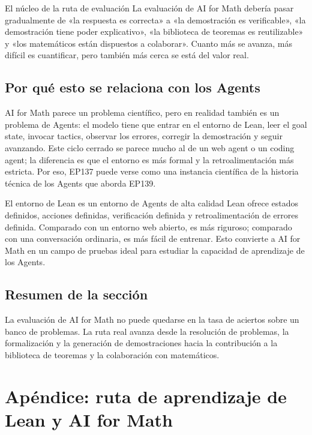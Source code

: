 \documentclass[a4paper]{article}
\begin{document}
\begin{importantbox}{El núcleo de la ruta de evaluación}
La evaluación de AI for Math debería pasar gradualmente de «la respuesta es correcta» a «la demostración es verificable», «la demostración tiene poder explicativo», «la biblioteca de teoremas es reutilizable» y «los matemáticos están dispuestos a colaborar». Cuanto más se avanza, más difícil es cuantificar, pero también más cerca se está del valor real.
\end{importantbox}

\subsection{Por qué esto se relaciona con los Agents}

AI for Math parece un problema científico, pero en realidad también es un problema de Agents: el modelo tiene que entrar en el entorno de Lean, leer el goal state, invocar tactics, observar los errores, corregir la demostración y seguir avanzando. Este ciclo cerrado se parece mucho al de un web agent o un coding agent; la diferencia es que el entorno es más formal y la retroalimentación más estricta. Por eso, EP137 puede verse como una instancia científica de la historia técnica de los Agents que aborda EP139.

\begin{knowledgebox}{El entorno de Lean es un entorno de Agents de alta calidad}
Lean ofrece estados definidos, acciones definidas, verificación definida y retroalimentación de errores definida. Comparado con un entorno web abierto, es más riguroso; comparado con una conversación ordinaria, es más fácil de entrenar. Esto convierte a AI for Math en un campo de pruebas ideal para estudiar la capacidad de aprendizaje de los Agents.
\end{knowledgebox}

\subsection{Resumen de la sección}

La evaluación de AI for Math no puede quedarse en la tasa de aciertos sobre un banco de problemas. La ruta real avanza desde la resolución de problemas, la formalización y la generación de demostraciones hacia la contribución a la biblioteca de teoremas y la colaboración con matemáticos.

\section{Apéndice: ruta de aprendizaje de Lean y AI for Math}
\end{document}
